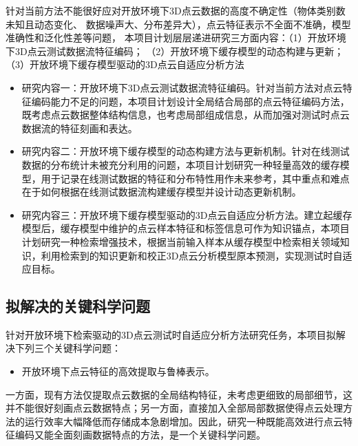\documentclass[12pt]{article}
\begin{document}
针对当前方法不能很好应对开放环境下3D点云数据的高度不确定性（物体类别数未知且动态变化、
数据噪声大、分布差异大），点云特征表示不全面不准确，模型准确性和泛化性差等问题，
本项目计划层层递进研究三方面内容：（1）开放环境下3D点云测试数据流特征编码；
（2）开放环境下缓存模型的动态构建与更新；（3）开放环境下缓存模型驱动的3D点云自适应分析方法

\begin{itemize}
    \item 研究内容一：开放环境下3D点云测试数据流特征编码。针对当前方法对点云特征编码能力不足的问题，本项目计划设计全局结合局部的点云特征编码方法，既考虑点云数据整体结构信息，也考虑局部组成信息，从而加强对测试时点云数据流的特征刻画和表达。
\end{itemize}


\begin{itemize}
    \item 研究内容二：开放环境下缓存模型的动态构建方法与更新机制。针对在线测试数据的分布统计未被充分利用的问题，本项目计划研究一种轻量高效的缓存模型，用于记录在线测试数据的特征和分布特性用作未来参考，其中重点和难点在于如何根据在线测试数据流构建缓存模型并设计动态更新机制。
\end{itemize}


\begin{itemize}
    \item 研究内容三：开放环境下缓存模型驱动的3D点云自适应分析方法。建立起缓存模型后，缓存模型中维护的点云样本特征和标签信息可作为知识锚点，本项目计划研究一种检索增强技术，根据当前输入样本从缓存模型中检索相关领域知识，利用检索到的知识更新和校正3D点云分析模型原本预测，实现测试时自适应目标。
\end{itemize}


\subsection{拟解决的关键科学问题}


针对开放环境下检索驱动的3D点云测试时自适应分析方法研究任务，本项目拟解决下列三个关键科学问题：

\begin{itemize}
    \item 开放环境下点云特征的高效提取与鲁棒表示。
\end{itemize}
一方面，现有方法仅提取点云数据的全局结构特征，未考虑更细致的局部细节，这并不能很好刻画点云数据特点；另一方面，直接加入全部局部数据使得点云处理方法的运行效率大幅降低而存储成本急剧增加。因此，研究一种既能高效进行点云特征编码又能全面刻画数据特点的方法，是一个关键科学问题。
\end{document}
